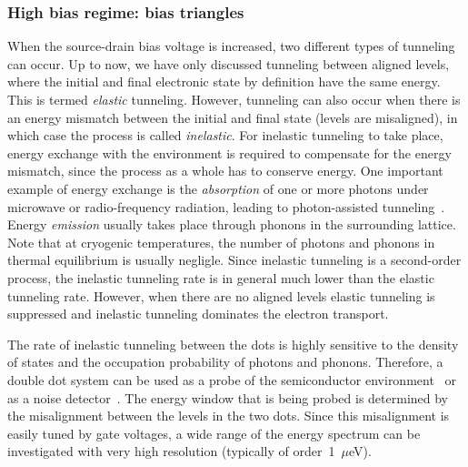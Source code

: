 \documentclass[rmp,twocolumn,aps]{revtex4}
\begin{document}
\subsubsection{High bias regime: bias triangles}
When the source-drain bias voltage is increased, two different
types of tunneling can occur. Up to now, we have only discussed
tunneling between aligned levels, where the initial and final
electronic state by definition have the same energy. This is
termed \textit{elastic} tunneling. However, tunneling can also
occur when there is an energy mismatch between the initial and
final state (levels are misaligned), in which case the process is
called \textit{inelastic}. For inelastic tunneling to take place,
energy exchange with the environment is required to compensate for
the energy mismatch, since the process as a whole has to conserve
energy. One important example of energy exchange is the
\textit{absorption} of one or more photons under microwave or
radio-frequency radiation, leading to photon-assisted
tunneling~\cite{WielRMP2003}. Energy \textit{emission} usually
takes place through phonons in the surrounding lattice. Note that
at cryogenic temperatures, the number of photons and phonons in
thermal equilibrium is usually negligle. Since inelastic tunneling
is a second-order process, the inelastic tunneling rate is in
general much lower than the elastic tunneling rate. However, when
there are no aligned levels elastic tunneling is suppressed and
inelastic tunneling dominates the electron transport.

The rate of inelastic tunneling between the dots is highly
sensitive to the density of states and the occupation probability
of photons and phonons. Therefore, a double dot system can be used
as a probe of the semiconductor environment~\cite{WielRMP2003} or
as a noise detector~\cite{AguadoPRL2000,OnacPRL2006}. The energy
window that is being probed is determined by the misalignment
between the levels in the two dots. Since this misalignment is
easily tuned by gate voltages, a wide range of the energy spectrum
can be investigated with very high resolution (typically of
order~1~$\mu$eV).
\end{document}
